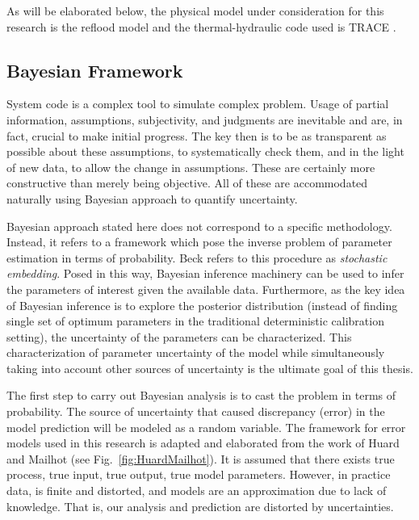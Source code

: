 \documentclass[11pt,titlepage]{article}
\begin{document}
As will be elaborated below, the physical model under consideration for this research is the reflood model and the thermal-hydraulic code used is TRACE \cite{TraceTheory2012}.

\subsection{Bayesian Framework}

System code is a complex tool to simulate complex problem. 
Usage of partial information, assumptions, subjectivity, and judgments are inevitable and are, in fact, crucial to make initial progress. 
The key then is to be as transparent as possible about these assumptions, to systematically check them, and in the light of new data, to allow the change in assumptions. 
These are certainly more constructive than merely being objective. 
All of these are accommodated naturally using Bayesian approach to quantify uncertainty.

Bayesian approach stated here does not correspond to a specific methodology. 
Instead, it refers to a framework which pose the inverse problem of parameter estimation in terms of probability. 
Beck \cite{Beck2010} refers to this procedure as \emph{stochastic embedding}. 
Posed in this way, Bayesian inference machinery can be used to infer the parameters of interest given the available data. 
Furthermore, as the key idea of Bayesian inference is to explore the posterior distribution (instead of finding single set of optimum parameters in the traditional deterministic calibration setting), the uncertainty of the parameters can be characterized. 
This characterization of parameter uncertainty of the model while simultaneously taking into account other sources of uncertainty is the ultimate goal of this thesis. 

The first step to carry out Bayesian analysis is to cast the problem in terms of probability. 
The source of uncertainty that caused discrepancy (error) in the model prediction will be modeled as a random variable. 
The framework for error models used in this research is adapted and elaborated from the work of Huard and Mailhot \cite{HuardMailhot2006} (see Fig.~\ref{fig:HuardMailhot}). 
It is assumed that there exists true process, true input, true output, true model parameters. 
However, in practice data, is finite and distorted, and models are an approximation due to lack of knowledge. 
That is, our analysis and prediction are distorted by uncertainties. 
\end{document}
